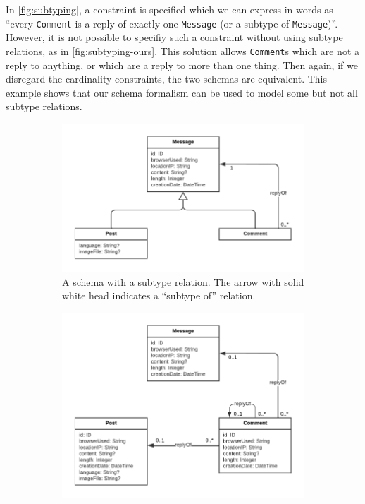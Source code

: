 \documentclass{article}
\begin{document}
In \autoref{fig:subtyping}, a constraint is specified which we can express in words as ``every \texttt{Comment} is a reply of exactly one \texttt{Message} (or a subtype of \texttt{Message})''. However, it is not possible to specifiy such a constraint without using subtype relations, as in \autoref{fig:subtyping-ours}. This solution allows \texttt{Comment}s which are not a reply to anything, or which are a reply to more than one thing. Then again, if we disregard the cardinality constraints, the two schemas are equivalent. This example shows that our schema formalism can be used to model some but not all subtype relations.

\begin{figure}[t]
  \centering
  \begin{subfigure}[t]{0.45\textwidth}
    \centering
    \includegraphics[width=\textwidth]{figures/subtyping.pdf}
    \caption{A schema with a subtype relation. The arrow with solid white head indicates a ``subtype of'' relation.}
    \label{fig:subtyping}
  \end{subfigure}
  \hfill
  \begin{subfigure}[t]{0.45\textwidth}
    \centering
    \includegraphics[width=\textwidth]{figures/subtyping-ours.pdf}

\end{subfigure}
\end{figure}
\end{document}
